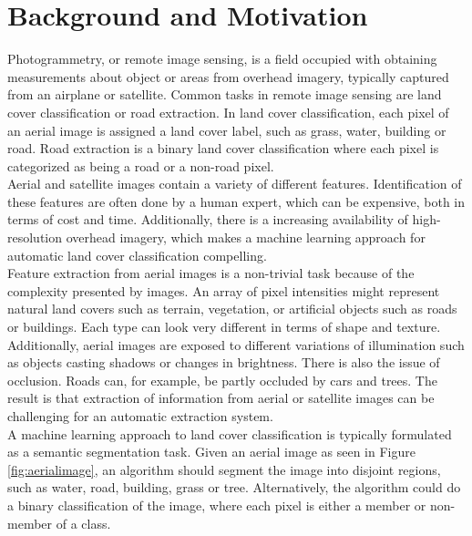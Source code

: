 \section{Background and Motivation}\label{cit}
\label{sec:BackgroundAndMotivation}
Photogrammetry, or remote image sensing, is a field occupied with obtaining measurements about object or areas from overhead imagery, typically captured from an airplane or satellite. Common tasks in remote image sensing are land cover classification or road extraction. In land cover classification, each pixel of an aerial image is assigned a land cover label, such as grass, water, building or road. Road extraction is a binary land cover classification where each pixel is categorized as being a road or a non-road pixel.\\


Aerial and satellite images contain a variety of different features. Identification of these features are often done by a human expert, which can be expensive, both in terms of cost and time. Additionally, there is a increasing availability of high-resolution overhead imagery, which makes a machine learning approach for automatic land cover classification compelling. \\

Feature extraction from aerial images is a non-trivial task because of the complexity presented by images. An array of pixel intensities might represent natural land covers such as terrain, vegetation, or artificial objects such as roads or buildings. Each type can look very different in terms of shape and texture. Additionally, aerial images are exposed to different variations of illumination such as objects casting shadows or changes in brightness. There is also the issue of occlusion. Roads can, for example, be partly occluded by cars and trees. The result is that extraction of information from aerial or satellite images can be challenging for an automatic extraction system. \\

A machine learning approach to land cover classification is typically formulated as a semantic segmentation task. Given an aerial image as seen in Figure \ref{fig:aerialimage}, an algorithm should segment the image into disjoint regions, such as water, road, building, grass or tree. Alternatively, the algorithm could do a binary classification of the image, where each pixel is either a member or non-member of a class.\\

